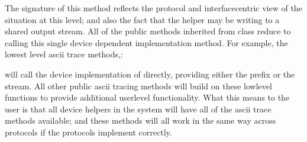 \documentclass[letterpaper,10pt,english]{sphinxmanual}
\renewcommand{\sphinxcode}[1]{\texttt{\small{#1}}}
\begin{document}
The signature of this method reflects the protocol\sphinxhyphen{} and interface\sphinxhyphen{}centric view
of the situation at this level; and also the fact that the helper may be writing
to a shared output stream.  All of the public methods inherited from class
\sphinxcode{} reduce to calling this single device\sphinxhyphen{}
dependent implementation method. For example, the lowest level ascii trace
methods,:

\begin{sphinxVerbatim}[commandchars=\\\{\}]
       
       
\end{sphinxVerbatim}

will call the device implementation of \sphinxcode{} directly,
providing either the prefix or the stream. All other public ascii tracing
methods will build on these low\sphinxhyphen{}level functions to provide additional user\sphinxhyphen{}level
functionality. What this means to the user is that all device helpers in the
system will have all of the ascii trace methods available; and these methods
will all work in the same way across protocols if the protocols implement
\sphinxcode{} correctly.
\end{document}
